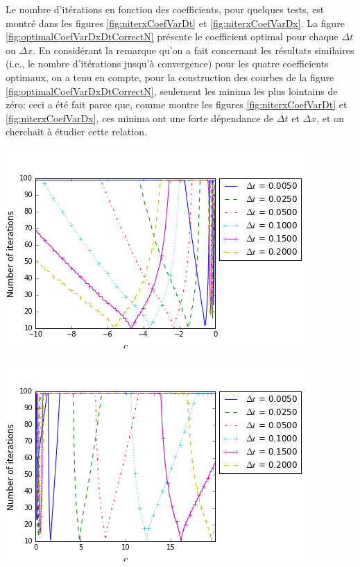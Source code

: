 \indent Le nombre d'itérations en fonction des coefficients, pour quelques tests, est montré dans les figures \ref{fig:niterxCoefVarDt} et \ref{fig:niterxCoefVarDx}. La figure \ref{fig:optimalCoefVarDxDtCorrectN} présente le coefficient optimal pour chaque $\Delta t$ ou $\Delta x$. En considérant la remarque qu'on a fait concernant les résultats similaires (i.e., le nombre d'itérations jusqu'à convergence) pour les quatre coefficients optimaux, on a tenu en compte, pour la construction des courbes de la figure \ref{fig:optimalCoefVarDxDtCorrectN}, seulement les minima les plus lointains de zéro: ceci a été fait parce que, comme montre les figures \ref{fig:niterxCoefVarDt} et \ref{fig:niterxCoefVarDx}, ces minima ont une forte dépendance de $\Delta t$ et $\Delta x$, et on cherchait à étudier cette relation.

\begingroup
\noindent
\begin{minipage}{.45\linewidth}
	\includegraphics[scale=.45]{figures/FinalFigures/NiterxCoefVarDtdx250FinalVersionNMarshal.png}
\end{minipage}
\hfill
\begin{minipage}{.45\linewidth}
	\includegraphics[scale=.45]{figures/FinalFigures/NiterxCoefVarDtdx250FinalVersionPMarshal.png}
\end{minipage}
\endgroup

